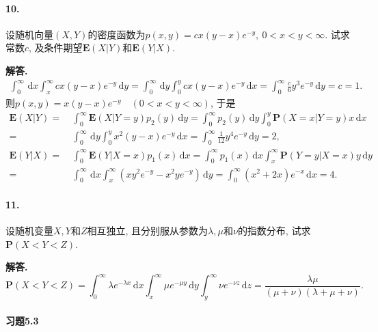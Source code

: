 \documentclass[12pt, a4paper, oneside]{ctexart}
\newenvironment{solution}{\par\noindent\textbf{解答. }}{\bigskip\par}
\def\d{\mathrm{d}}      %
\def\P{\textbf{P}}      %
\def\E{\textbf{E}}      %
\def\del{\vspace{-3.5ex}}  %
\begin{document}
\paragraph{10.}设随机向量$(X, Y)$的密度函数为$p(x, y) = cx(y-x)e^{-y},\ 0<x<y<\infty$. 试求常数$c$, 及条件期望$\E(X|Y)$和$\E(Y|X)$.
\begin{solution}
    \begin{align*}
        \int_0^{\infty}\,\d x\int_x^\infty cx(y-x)e^{-y}\,\d y = \int_0^{\infty}\,\d y\int_0^y cx(y-x)e^{-y}\,\d x = \int_0^\infty \frac{c}{6}y^3e^{-y}\,\d y = c = 1.
    \end{align*}
    则$p(x, y) = x(y-x)e^{-y}\quad(0<x<y<\infty)$, 于是
    \begin{align*}
        \E(X|Y) =&\ \int_0^\infty \E(X|Y = y)p_2(y)\,\d y = \int_0^\infty p_2(y)\,\d y \int_0^y \P(X=x|Y=y)x\,\d x\\
        =&\ \int_0^\infty\,\d y\int_0^yx^2(y-x)e^{-y}\,\d x = \int_0^{\infty}\frac{1}{12}y^4e^{-y}\,\d y = 2,\\
        \E(Y|X)=&\ \int_0^\infty\E(Y|X= x)p_1(x)\,\d x = \int_0^\infty p_1(x)\,\d x\int_x^{\infty}\P(Y=y|X=x)y\,\d y\\
        =&\ \int_0^\infty \,\d x\int_x^\infty \left(xy^2e^{-y}-x^2ye^{-y}\right)\,\d y = \int_0^{\infty}(x^2+2x)e^{-x}\,\d x = 4.
    \end{align*}
\end{solution}\del\del
\paragraph{11.}设随机变量$X, Y$和$Z$相互独立, 且分别服从参数为$\lambda,\mu$和$\nu$的指数分布, 试求$\P(X<Y<Z)$.
\begin{solution}\ \del
    \begin{equation*}
        \P(X<Y<Z) = \int_0^{\infty}\lambda e^{-\lambda x}\,\d x\int_x^\infty \mu e^{-\mu y}\,\d y\int_y^{\infty}\nu e^{-\nu z}\,\d z = \frac{\lambda\mu}{(\mu+\nu)(\lambda+\mu+\nu)}.
    \end{equation*}
\end{solution}\del\del
\clearpage
\paragraph{习题5.3}
\end{document}
